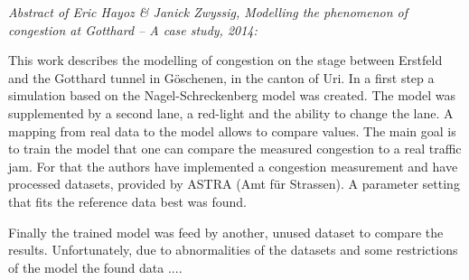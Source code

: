 \textit{Abstract of Eric Hayoz \& Janick Zwyssig, Modelling the phenomenon of congestion at Gotthard -- A case study, 2014:}

This work describes the modelling of congestion on the stage between Erstfeld and the Gotthard tunnel in Göschenen, in the canton of Uri. In a first step a simulation based on the Nagel-Schreckenberg model was created. The model was supplemented by a second lane, a red-light and the ability to change the lane. A mapping from real data to the model allows to compare values. 
The main goal is to train the model that one can compare the measured congestion to a real traffic jam. For that the authors have implemented a congestion measurement and have processed datasets, provided by ASTRA (Amt für Strassen). A parameter setting that fits the reference data best was found. 

Finally the trained model was feed by another, unused dataset to compare the results. Unfortunately, due to abnormalities of the datasets and some restrictions of the model the found data ....